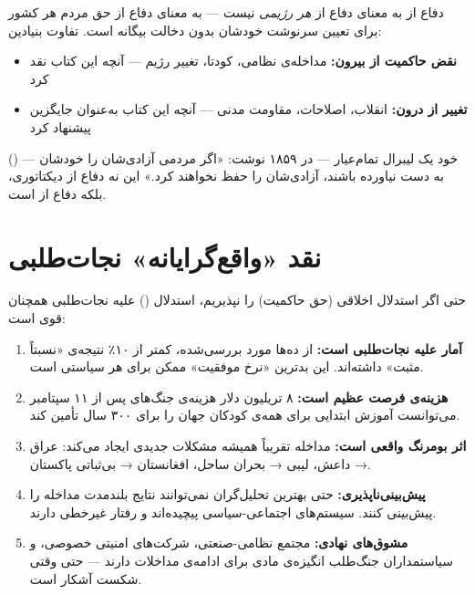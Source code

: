 دفاع از  به معنای دفاع از \textit{هر رژیمی} نیست — به معنای دفاع از حق مردم هر کشور برای تعیین سرنوشت خودشان بدون دخالت بیگانه است. تفاوت بنیادین:

\begin{itemize}
\item \textbf{نقض حاکمیت از بیرون:} مداخله‌ی نظامی، کودتا، تغییر رژیم — آنچه این کتاب نقد کرد
\item \textbf{تغییر از درون:} انقلاب، اصلاحات، مقاومت مدنی — آنچه این کتاب به‌عنوان جایگزین پیشنهاد کرد
\end{itemize}

 () — خود یک لیبرال تمام‌عیار — در ۱۸۵۹ نوشت: «اگر مردمی آزادی‌شان را خودشان به دست نیاورده باشند، آزادی‌شان را حفظ نخواهند کرد.» این نه دفاع از دیکتاتوری، بلکه دفاع از  است.


\section{نقد «واقع‌گرایانه» نجات‌طلبی}
\label{sec:app-b-realist-critique}

حتی اگر استدلال اخلاقی (حق حاکمیت) را نپذیریم، استدلال  () علیه نجات‌طلبی همچنان قوی است:

\begin{tcolorbox}[failbox, title={پنج دلیل واقع‌گرایانه علیه نجات‌طلبی}]
\begin{enumerate}
\item \textbf{آمار علیه نجات‌طلبی است:} از ده‌ها مورد بررسی‌شده، کمتر از ۱۰٪ نتیجه‌ی «نسبتاً مثبت» داشته‌اند. این بدترین «نرخ موفقیت» ممکن برای هر سیاستی است.

\item \textbf{هزینه‌ی فرصت عظیم است:} ۸ تریلیون دلار هزینه‌ی جنگ‌های پس از ۱۱ سپتامبر می‌توانست آموزش ابتدایی برای همه‌ی کودکان جهان را برای ۳۰۰ سال تأمین کند.

\item \textbf{اثر بومرنگ واقعی است:} مداخله تقریباً همیشه مشکلات جدیدی ایجاد می‌کند: عراق → داعش، لیبی → بحران ساحل، افغانستان → بی‌ثباتی پاکستان.

\item \textbf{پیش‌بینی‌ناپذیری:} حتی بهترین تحلیل‌گران نمی‌توانند نتایج بلندمدت مداخله را پیش‌بینی کنند. سیستم‌های اجتماعی-سیاسی پیچیده‌اند و رفتار غیرخطی دارند.

\item \textbf{مشوق‌های نهادی:} مجتمع نظامی-صنعتی، شرکت‌های امنیتی خصوصی، و سیاستمداران جنگ‌طلب انگیزه‌ی مادی برای ادامه‌ی مداخلات دارند — حتی وقتی شکست آشکار است.
\end{enumerate}
\end{tcolorbox}


